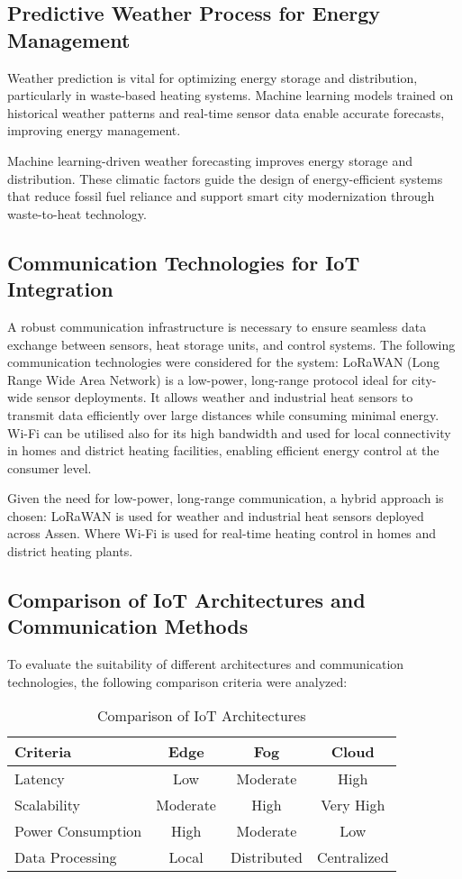 \documentclass{article}
\begin{document}
\subsection{Predictive Weather Process for Energy Management}

Weather prediction is vital for optimizing energy storage and distribution, particularly in waste-based heating systems. Machine learning models trained on historical weather patterns and real-time sensor data enable accurate forecasts, improving energy management.

Machine learning-driven weather forecasting improves energy storage and distribution. These climatic factors guide the design of energy-efficient systems that reduce fossil fuel reliance and support smart city modernization through waste-to-heat technology.

\subsection{Communication Technologies for IoT Integration}

A robust communication infrastructure is necessary to ensure seamless data exchange between sensors, heat storage units, and control systems. The following communication technologies were considered for the system:
LoRaWAN (Long Range Wide Area Network) is a low-power, long-range protocol ideal for city-wide sensor deployments. It allows weather and industrial heat sensors to transmit data efficiently over large distances while consuming minimal energy.
Wi-Fi can be utilised also for its high bandwidth and used for local connectivity in homes and district heating facilities, enabling efficient energy control at the consumer level.

Given the need for low-power, long-range communication, a hybrid approach is chosen:
LoRaWAN is used for weather and industrial heat sensors deployed across Assen. Where Wi-Fi is used for real-time heating control in homes and district heating plants.

\subsection{Comparison of IoT Architectures and Communication Methods}

To evaluate the suitability of different architectures and communication technologies, the following comparison criteria were analyzed:

\begin{table}[h]
\centering
\caption{Comparison of IoT Architectures}
\begin{tabular}{|l|c|c|c|}
\hline
\textbf{Criteria} & \textbf{Edge} & \textbf{Fog} & \textbf{Cloud} \\
\hline
Latency & Low & Moderate & High \\
Scalability & Moderate & High & Very High \\
Power Consumption & High & Moderate & Low \\
Data Processing & Local & Distributed & Centralized \\
\hline
\end{tabular}
\end{table}
\end{document}
